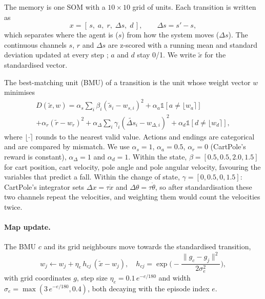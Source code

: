 \documentclass{article}
\newcommand{\dS}{\Delta s}
\newcommand{\one}{\mathbb{1}}
\begin{document}
The memory is one SOM with a $10 \times 10$ grid of units. Each transition is
written as
\begin{equation}
  x = [\,s,\; a,\; r,\; \dS,\; d\,], \qquad \dS = s' - s,
  \label{eq:vector}
\end{equation}
which separates where the agent is ($s$) from how the system moves ($\dS$).
The continuous channels $s$, $r$ and $\dS$ are z-scored with a running mean
and standard deviation updated at every step \citep{welford1962note}; $a$
and $d$ stay 0/1. We write $\tilde{x}$ for the standardised vector.

The best-matching unit (BMU) of a transition is the unit whose weight vector
$w$ minimises
\begin{multline}
  D(\tilde{x}, w) = \alpha_s \sum_{i} \beta_i (\tilde{s}_i - w_{s,i})^2
  + \alpha_a \one[a \neq \lfloor w_a \rceil] \\
  + \alpha_r (\tilde{r} - w_r)^2
  + \alpha_{\Delta} \sum_i \gamma_i (\widetilde{\dS}_i - w_{\Delta,i})^2
  + \alpha_d \one[d \neq \lfloor w_d \rceil],
  \label{eq:distance}
\end{multline}
where $\lfloor\cdot\rceil$ rounds to the nearest valid value. Actions and
endings are categorical and are compared by mismatch. We use $\alpha_s = 1$,
$\alpha_a = 0.5$, $\alpha_r = 0$ (CartPole's reward is constant),
$\alpha_\Delta = 1$ and $\alpha_d = 1$. Within the state,
$\beta = [0.5, 0.5, 2.0, 1.5]$ for cart position, cart velocity, pole angle
and pole angular velocity, favouring the variables that predict a fall.
Within the change of state, $\gamma = [0, 0.5, 0, 1.5]$: CartPole's
integrator sets $\Delta x = \tau \dot{x}$ and $\Delta\theta = \tau
\dot{\theta}$, so after standardisation these two channels repeat the
velocities, and weighting them would count the velocities twice.

\paragraph{Map update.} The BMU $c$ and its grid neighbours move towards the
standardised transition,
\begin{equation}
  w_j \leftarrow w_j + \eta_e\, h_{cj}\, (\tilde{x} - w_j), \quad
  h_{cj} = \exp\!\Big(-\frac{\lVert g_c - g_j \rVert^2}{2\sigma_e^2}\Big),
  \label{eq:som}
\end{equation}
with grid coordinates $g$, step size $\eta_e = 0.1\, e^{-e/180}$ and width
$\sigma_e = \max(3\, e^{-e/180}, 0.4)$, both decaying with the episode index
$e$.
\end{document}
